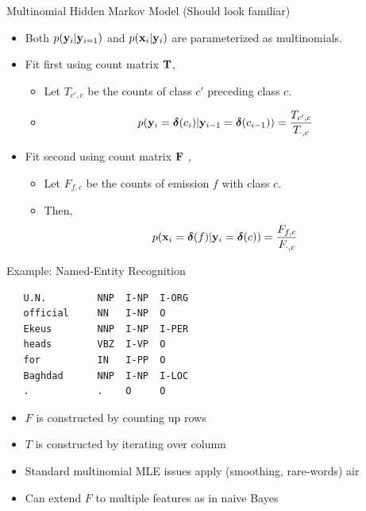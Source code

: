 \documentclass{beamer}
\begin{document}
\begin{frame}{Multinomial Hidden Markov Model}
  (Should look familiar)
  \begin{itemize}
  \item  Both  $p(\mathbf{y}_i | \mathbf{y}_{i=1})$ and $p(\mathbf{x}_i | \mathbf{y}_i)$ are
    parameterized as multinomials.
    
  \item Fit first using count matrix $\mathbf{T}$,
    \begin{itemize}
      \item Let $T_{c',c}$ be the counts of class $c'$ preceding class $c$.

      \item \[p(\mathbf{y}_i = \boldsymbol{\delta}(c_i) | \mathbf{y}_{i-1} = \boldsymbol{\delta}(c_{i-1})) = \frac{T_{c', c}}{T_{\cdot,c}} \]
    \end{itemize}
    \pause

  \item Fit second using count matrix $\mathbf{F}$ ,
    \begin{itemize}
      \item Let $F_{f,c}$ be the counts of emission $f$ with class $c$.
      \item Then,
      \[p(\mathbf{x}_i=\boldsymbol{\delta}(f) | \mathbf{y}_i=\boldsymbol{\delta}(c)) = \frac{F_{f, c}}{F_{\cdot,c}}  \]     
    \end{itemize}
  \end{itemize}
\end{frame}



\begin{frame}{Example: Named-Entity Recognition}  
\begin{verbatim}
   U.N.         NNP  I-NP  I-ORG 
   official     NN   I-NP  O 
   Ekeus        NNP  I-NP  I-PER 
   heads        VBZ  I-VP  O 
   for          IN   I-PP  O 
   Baghdad      NNP  I-NP  I-LOC 
   .            .    O     O 
\end{verbatim}


  \begin{itemize}
  \item $F$ is constructed by counting up rows
    \air 
  \item $T$ is constructed by iterating over column
    \air
  \item Standard multinomial MLE issues apply (smoothing, rare-words)
    air 
  \item Can extend $F$ to multiple features as in naive Bayes 
  \end{itemize}
\end{frame}
\end{document}
